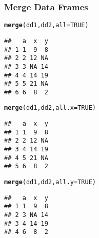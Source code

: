 \documentclass[paper=screen,mathserif]{beamer}\usepackage[]{graphicx}\usepackage[]{color}
\makeatletter
\newcommand{\hlnum}[1]{\textcolor[rgb]{0.686,0.059,0.569}{#1}}%
\newcommand{\hlstd}[1]{\textcolor[rgb]{0.345,0.345,0.345}{#1}}%
\newcommand{\hlkwc}[1]{\textcolor[rgb]{0.333,0.667,0.333}{#1}}%
\newcommand{\hlkwd}[1]{\textcolor[rgb]{0.737,0.353,0.396}{\textbf{#1}}}%
\newenvironment{kframe}{%
 \def\at@end@of@kframe{}%
 \ifinner\ifhmode%
  \def\at@end@of@kframe{\end{minipage}}%
  \begin{minipage}{\columnwidth}%
 \fi\fi%
 \def\FrameCommand##1{\hskip\@totalleftmargin \hskip-\fboxsep
 \colorbox{shadecolor}{##1}\hskip-\fboxsep
     \hskip-\linewidth \hskip-\@totalleftmargin \hskip\columnwidth}%
 \MakeFramed {\advance\hsize-\width
   \@totalleftmargin\z@ \linewidth\hsize
   \@setminipage}}%
 {\par\unskip\endMakeFramed%
 \at@end@of@kframe}
\newenvironment{knitrout}{}{} %
\newcommand{\ft}[1]{\frametitle{#1}}
\makeatother
\begin{document}
\begin{frame}[fragile]
  \ft{Merge Data Frames}

\begin{knitrout}\tiny
{}\color{fgcolor}\begin{kframe}
\begin{alltt}
\hlkwd{merge}\hlstd{(dd1, dd2,} \hlkwc{all} \hlstd{=} \hlnum{TRUE}\hlstd{)}
\end{alltt}
\begin{verbatim}
##   a  x  y
## 1 1  9  8
## 2 2 12 NA
## 3 3 NA 14
## 4 4 14 19
## 5 5 21 NA
## 6 6  8  2
\end{verbatim}
\end{kframe}
\end{knitrout}
\pause
\begin{knitrout}\tiny
{}\color{fgcolor}\begin{kframe}
\begin{alltt}
\hlkwd{merge}\hlstd{(dd1, dd2,} \hlkwc{all.x} \hlstd{=} \hlnum{TRUE}\hlstd{)}
\end{alltt}
\begin{verbatim}
##   a  x  y
## 1 1  9  8
## 2 2 12 NA
## 3 4 14 19
## 4 5 21 NA
## 5 6  8  2
\end{verbatim}
\end{kframe}
\end{knitrout}
\pause
\begin{knitrout}\tiny
{}\color{fgcolor}\begin{kframe}
\begin{alltt}
\hlkwd{merge}\hlstd{(dd1, dd2,} \hlkwc{all.y} \hlstd{=} \hlnum{TRUE}\hlstd{)}
\end{alltt}
\begin{verbatim}
##   a  x  y
## 1 1  9  8
## 2 3 NA 14
## 3 4 14 19
## 4 6  8  2
\end{verbatim}
\end{kframe}
\end{knitrout}

\end{frame}
\end{document}
